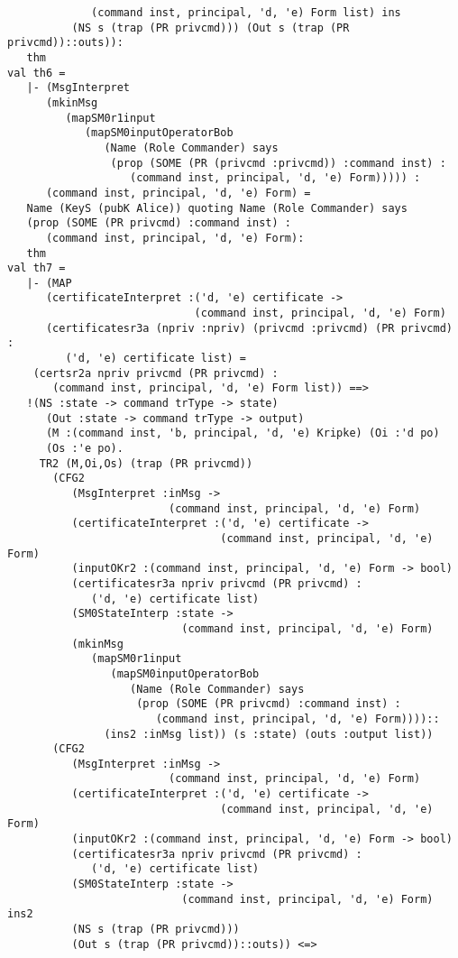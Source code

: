 \documentclass{report}
\begin{document}
\begin{session}
\begin{scriptsize}
\begin{verbatim}
             (command inst, principal, 'd, 'e) Form list) ins
          (NS s (trap (PR privcmd))) (Out s (trap (PR privcmd))::outs)):
   thm
val th6 =
   |- (MsgInterpret
      (mkinMsg
         (mapSM0r1input
            (mapSM0inputOperatorBob
               (Name (Role Commander) says
                (prop (SOME (PR (privcmd :privcmd)) :command inst) :
                   (command inst, principal, 'd, 'e) Form))))) :
      (command inst, principal, 'd, 'e) Form) =
   Name (KeyS (pubK Alice)) quoting Name (Role Commander) says
   (prop (SOME (PR privcmd) :command inst) :
      (command inst, principal, 'd, 'e) Form):
   thm
val th7 =
   |- (MAP
      (certificateInterpret :('d, 'e) certificate ->
                             (command inst, principal, 'd, 'e) Form)
      (certificatesr3a (npriv :npriv) (privcmd :privcmd) (PR privcmd) :
         ('d, 'e) certificate list) =
    (certsr2a npriv privcmd (PR privcmd) :
       (command inst, principal, 'd, 'e) Form list)) ==>
   !(NS :state -> command trType -> state)
      (Out :state -> command trType -> output)
      (M :(command inst, 'b, principal, 'd, 'e) Kripke) (Oi :'d po)
      (Os :'e po).
     TR2 (M,Oi,Os) (trap (PR privcmd))
       (CFG2
          (MsgInterpret :inMsg ->
                         (command inst, principal, 'd, 'e) Form)
          (certificateInterpret :('d, 'e) certificate ->
                                 (command inst, principal, 'd, 'e) Form)
          (inputOKr2 :(command inst, principal, 'd, 'e) Form -> bool)
          (certificatesr3a npriv privcmd (PR privcmd) :
             ('d, 'e) certificate list)
          (SM0StateInterp :state ->
                           (command inst, principal, 'd, 'e) Form)
          (mkinMsg
             (mapSM0r1input
                (mapSM0inputOperatorBob
                   (Name (Role Commander) says
                    (prop (SOME (PR privcmd) :command inst) :
                       (command inst, principal, 'd, 'e) Form))))::
               (ins2 :inMsg list)) (s :state) (outs :output list))
       (CFG2
          (MsgInterpret :inMsg ->
                         (command inst, principal, 'd, 'e) Form)
          (certificateInterpret :('d, 'e) certificate ->
                                 (command inst, principal, 'd, 'e) Form)
          (inputOKr2 :(command inst, principal, 'd, 'e) Form -> bool)
          (certificatesr3a npriv privcmd (PR privcmd) :
             ('d, 'e) certificate list)
          (SM0StateInterp :state ->
                           (command inst, principal, 'd, 'e) Form) ins2
          (NS s (trap (PR privcmd)))
          (Out s (trap (PR privcmd))::outs)) <=>

\end{verbatim}
\end{scriptsize}
\end{session}
\end{document}
